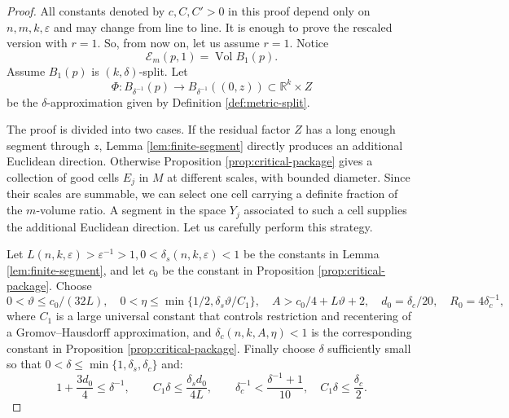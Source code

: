 \documentclass[10pt,a4paper]{amsart}
\newcommand{\Ex}{\mathcal E}
\DeclareMathOperator{\Vol}{Vol}
\begin{document}
\begin{proof}
All constants denoted by $c,C,C'>0$ in this proof depend only on
$n,m,k,\varepsilon$ and may change from line to line. It is enough to prove the rescaled version with
$r=1$. So, from now on, let us assume $r=1$.
Notice
\[
                         \Ex_m(p,1)=\Vol B_1(p).
\]
Assume $B_{1}(p)$ is $(k,\delta)$-split. Let
\begin{equation}\label{eqn:Original}
 \Phi:B_{\delta^{-1}}(p)\longrightarrow
 B_{\delta^{-1}}((0,z))\subset\mathbb R^k\times Z
\end{equation}
be the $\delta$-approximation given by  Definition \ref{def:metric-split}.
\smallskip

The proof is divided into two cases. If the residual factor $Z$ has a long enough segment through $z$, Lemma \ref{lem:finite-segment} directly produces an additional Euclidean direction. Otherwise Proposition
\ref{prop:critical-package} gives a collection of
good cells $E_j$ in $M$ at different scales, with bounded diameter.  Since their scales are summable, we can select one cell carrying a
definite fraction of the $m$-volume ratio. A segment in the space $Y_j$ associated to such a cell supplies the additional Euclidean direction. Let us carefully perform this strategy.
\smallskip

Let $L(n,k,\varepsilon)>\varepsilon^{-1}>1,0<\delta_s(n,k,\varepsilon)<1$ be the constants in Lemma \ref{lem:finite-segment}, and let $c_0$ be the constant in Proposition \ref{prop:critical-package}. Choose
\[
 0<\vartheta\le c_0/(32L),\quad
 0<\eta\le\min\{1/2,\delta_s\vartheta/C_1\},\quad
 A>c_0/4+L\vartheta+2,\quad
 d_0=\delta_c/20,\quad R_0=4\delta_c^{-1},
\]
where $C_{1}$ is a large universal constant that controls restriction and recentering of a
Gromov--Hausdorff approximation, and $\delta_c(n,k,A,\eta)<1$ is the corresponding constant in
Proposition \ref{prop:critical-package}. Finally choose $\delta$ sufficiently
small so that $0<\delta\leq \min\{1,\delta_s,\delta_c\}$ and:
\begin{equation}\label{eqn:ChoiceOfDelta}
    1+\frac{3d_0}{4}\leq \delta^{-1}, \qquad C_1\delta\leq \frac{\delta_s d_0}{4L}, \qquad \delta_c^{-1}<\frac{\delta^{-1}+1}{10}, \quad C_1\delta\leq \frac{\delta_c}{2}.
\end{equation}


\end{proof}
\end{document}
